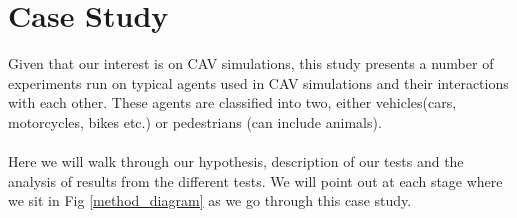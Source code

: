 \section{Case Study} \label{CaseStudy}
\begin{table}[h!]
\centering
{}
\caption{Set of experiments}
\label{TableOfExperiments}
\end{table}

\noindent Given that our interest is on CAV simulations, this study presents a number of experiments run on typical agents used in CAV simulations and their interactions with each other. These agents are classified into two, either vehicles(cars, motorcycles, bikes etc.) or pedestrians (can include animals). \\\\
Here we will walk through our hypothesis, description of our tests and the analysis of results from the different tests. We will point out at each stage where we sit in Fig \ref{method_diagram} as we go through this case study.    

